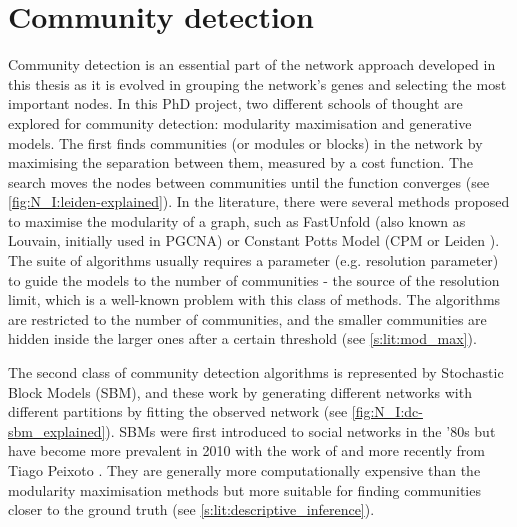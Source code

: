 \section{Community detection} \label{s:lit:comm_detect}

\vspace{3mm}
\vspace{3mm}

Community detection is an essential part of the network approach developed in this thesis as it is evolved in grouping the network's genes and selecting the most important nodes. In this PhD project, two different schools of thought are explored for community detection: modularity maximisation and generative models. The first finds communities (or modules or blocks) in the network by maximising the separation between them, measured by a cost function. The search moves the nodes between communities until the function converges (see \cref{fig:N_I:leiden-explained}). In the literature, there were several methods proposed to maximise the modularity of a graph, such as FastUnfold \citep{Blondel2008-ik} (also known as Louvain, initially used in PGCNA) or Constant Potts Model (CPM or Leiden \citet{Traag2019-ne}). The suite of algorithms usually requires a parameter (e.g. resolution parameter) to guide the models to the number of communities - the source of the resolution limit, which is a well-known problem with this class of methods. The algorithms are restricted to the number of communities, and the smaller communities are hidden inside the larger ones after a certain threshold (see \cref{s:lit:mod_max}).

The second class of community detection algorithms is represented by Stochastic Block Models (SBM), and these work by generating different networks with different partitions by fitting the observed network (see \cref{fig:N_I:dc-sbm_explained}). SBMs were first introduced to social networks \citep{Holland1983-eu} in the '80s but have become more prevalent in 2010 with the work of \citet{Karrer2011-si} and more recently from Tiago Peixoto \citep{Peixoto2014-ls,Peixoto2019-fg,Peixoto2018-ot,Peixoto2023-se,Peixoto2024-ua}. They are generally more computationally expensive than the modularity maximisation methods but more suitable for finding communities closer to the ground truth (see \cref{s:lit:descriptive_inference}).

